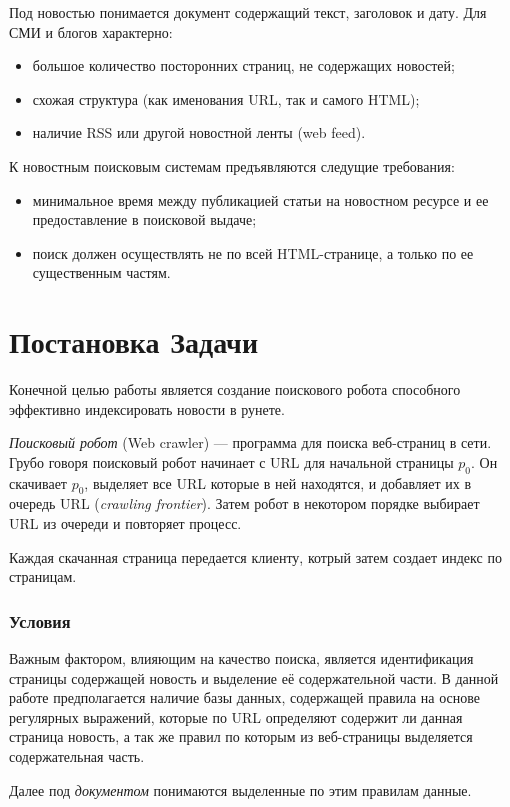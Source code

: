 Под новостью понимается документ содержащий текст, заголовок и дату. Для СМИ и
блогов характерно:
\begin{itemize} 
 \item большое количество посторонних страниц, не содержащих новостей;
 \item схожая структура (как именования URL, так и самого HTML);
 \item наличие RSS или другой новостной ленты (web feed).
\end{itemize}

К новостным поисковым системам предъявляются следущие требования:
\begin{itemize} 
\item минимальное время между публикацией статьи на новостном ресурсе и ее 
    предоставление в поисковой выдаче;
\item поиск должен осуществлять не по всей HTML-странице, а только по ее 
    существенным частям. 
\end{itemize}

\chapter{Постановка Задачи}
Конечной целью работы является создание поискового робота способного эффективно индексировать новости в рунете.

\textit{Поисковый робот} (Web crawler) --- программа для поиска веб-страниц в сети\cite{crawl}. Грубо говоря поисковый робот начинает с URL для начальной страницы $p_{0}$.
 Он скачивает $p_{0}$, выделяет все URL которые в ней находятся, и добавляет их в очередь URL (\textit{crawling frontier}). Затем робот в некотором порядке выбирает URL из очереди и повторяет процесс.

Каждая скачанная страница передается клиенту, котрый затем создает индекс по страницам.
\subsection{Условия}
Важным фактором, влияющим на качество поиска, является идентификация страницы содержащей новость
 и выделение её содержательной части. В данной работе предполагается наличие базы данных,
 содержащей правила на основе регулярных выражений, которые по URL определяют содержит ли данная страница новость,
 а так же правил по которым из веб-страницы выделяется содержательная часть.

Далее под \textit{документом} понимаются выделенные по этим правилам данные.

